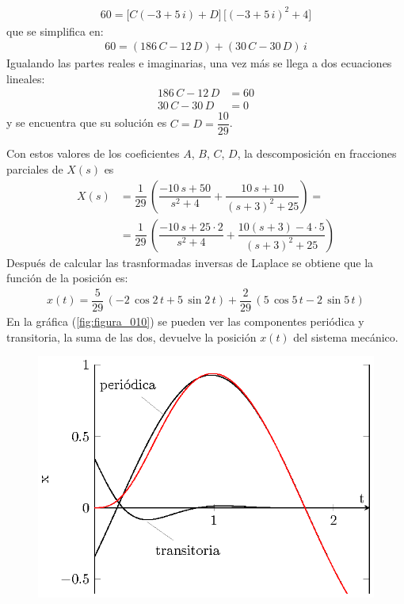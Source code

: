 \begin{ejemplo}
\begin{align*}
60 = \big[C (- 3 + 5 \, i) + D\big] \, \big[(-3 + 5 \, i)^{2} + 4\big]
\end{align*}
que se simplifica en:
\begin{align*}
60 = (186 \, C - 12 \, D) + (30 \, C - 30 \, D) \, i
\end{align*}
Igualando las partes reales e imaginarias, una vez más se llega a dos ecuaciones lineales:
\begin{align*}
186 \, C - 12 \, D &= 60 \\[0.5em]
30 \, C - 30 \, D &= 0
\end{align*}
y se encuentra que su solución es $C = D = \dfrac{10}{29}$.
\par
Con estos valores de los coeficientes $A$, $B$, $C$, $D$, la descomposición en fracciones parciales de $X(s)$ es
\begin{align*}
X(s) &= \dfrac{1}{29} \, \left( \dfrac{-10 \, s + 50}{s^{2} + 4} + \dfrac{10 \, s + 10}{(s + 3)^{2} + 25} \right) = \\[0.5em]
&= \dfrac{1}{29} \, \left( \dfrac{-10 \, s + 25 \cdot 2}{s^{2} + 4} + \dfrac{10 (s + 3) - 4 \cdot 5}{(s + 3)^{2} + 25} \right)
\end{align*}
Después de calcular las trasnformadas inversas de Laplace se obtiene que la función de la posición es:
\begin{align*}
x(t) = \dfrac{5}{29} \, ( - 2 \, \cos 2 \, t  + 5  \, \sin 2 \, t ) + \dfrac{2}{29} \, (5 \, \cos 5 \, t - 2 \, \sin 5 \, t)
\end{align*}
En la gráfica (\ref{fig:figura_010}) se pueden ver las componentes periódica y transitoria, la suma de las dos, devuelve la posición $x(t)$ del sistema mecánico.
\begin{figure}[H]
    \centering
    \includegraphics[scale=1.3]{Imagenes/sist_masa_resorte_dump_plot_03.eps}

\end{figure}
\end{ejemplo}
